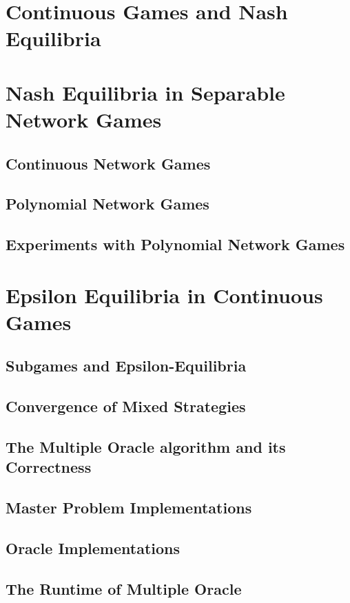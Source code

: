 \documentclass[../main.tex]{subfiles}
\begin{document}


\section{Continuous Games and Nash Equilibria}


\section{Nash Equilibria in Separable Network Games}\label{sec:separable}

\subsection{Continuous Network Games}\label{sec:net}

\subsection{Polynomial Network Games}\label{sec:poly}\label{sec:separable.poly}

\subsection{Experiments with Polynomial Network Games}\label{sec:separable.experiments}


\section{Epsilon Equilibria in Continuous Games}\label{sec:multiple.oracle}

\subsection{Subgames and Epsilon-Equilibria}

\subsection{Convergence of Mixed Strategies}

\subsection{The Multiple Oracle algorithm and its Correctness}

\subsection{Master Problem Implementations}

\subsection{Oracle Implementations}

\subsection{The Runtime of Multiple Oracle}\label{sec:custom.oracles}

\end{document}
